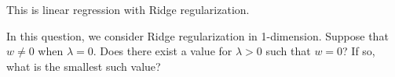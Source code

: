 \documentclass{article}
\begin{document}
This is linear regression with Ridge regularization.

\begin{subsolution}
 
\end{subsolution}

\subproblem In this question, we consider Ridge regularization in 1-dimension. Suppose that $w \neq 0$ when $\lambda = 0$. Does there exist a value for $\lambda > 0$ such that $w = 0$? If so, what is the smallest such value?

\begin{subsolution}

\end{subsolution}
\end{document}
